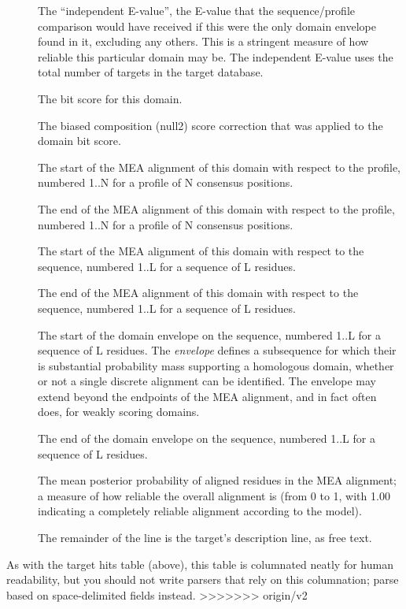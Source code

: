 \begin{description}
\item[] The ``independent E-value'', the
  E-value that the sequence/profile comparison would have received if
  this were the only domain envelope found in it, excluding any
  others. This is a stringent measure of how reliable this particular
  domain may be. The independent E-value uses the total number of
  targets in the target database.

\item[] The bit score for this domain.

\item[] The biased composition (null2) score
  correction that was applied to the domain bit score.

\item[]
  The start of the MEA alignment of this domain with respect to the
  profile, numbered 1..N for a profile of N consensus positions.

\item[]
  The end of the MEA alignment of this domain with respect to the
  profile, numbered 1..N for a profile of N consensus positions.

\item[]
  The start of the MEA alignment of this domain with respect to the
  sequence, numbered 1..L for a sequence of L residues.
 
\item[]
  The end of the MEA alignment of this domain with respect to the
  sequence, numbered 1..L for a sequence of L residues.

\item[] The start of the domain
  envelope on the sequence, numbered 1..L for a sequence of L
  residues. The \emph{envelope} defines a subsequence for which their
  is substantial probability mass supporting a homologous domain, 
  whether or not a single discrete alignment can be identified. 
  The envelope may extend beyond the endpoints of the MEA alignment,
  and in fact often does, for weakly scoring domains.

\item[] The end of the domain
  envelope on the sequence, numbered 1..L for a sequence of L
  residues. 

\item[] The mean posterior probability of aligned
  residues in the MEA alignment; a measure of how reliable the overall
  alignment is (from 0 to 1, with 1.00 indicating a completely
  reliable alignment according to the model).

\item[] The remainder of the line
  is the target's description line, as free text.
\end{description}

As with the target hits table (above), this table is columnated neatly
for human readability, but you should not write parsers that rely on
this columnation; parse based on space-delimited fields instead.
>>>>>>> origin/v2
